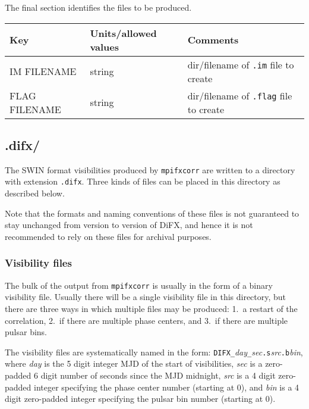 The final section identifies the files to be produced.

\begin{center}
\begin{tabular}{l l l}
\hline
Key & Units/allowed values & Comments \\
\hline
IM FILENAME        & string         & dir/filename of {\tt .im} file to create \\
FLAG FILENAME      & string         & dir/filename of {\tt .flag} file to create \\
\hline
\end{tabular}
\end{center}





\subsection{.difx/} \label{sec:difx}

The SWIN format visibilities produced by {\tt mpifxcorr} are written to a directory with extension {\tt .difx}.
Three kinds of files can be placed in this directory as described below.

Note that the formats and naming conventions of these files is not guaranteed to stay unchanged from version to version of DiFX, and hence it is not recommended to rely on these files for archival purposes.

\subsubsection{Visibility files} \label{sec:difxvisibilities}

The bulk of the output from {\tt mpifxcorr} is usually in the form of a binary visibility file.
Usually there will be a single visibility file in this directory, but there are three ways in which multiple files may be produced: 1.\ a restart of the correlation, 2.\ if there are multiple phase centers, and 3.\ if there are multiple pulsar bins.

The visibility files are systematically named in the form: {\tt DIFX\_}{\em day}{\tt \_}{\em sec}{\tt .s}{\em src}{\tt .b}{\em bin}, where {\em day} is the 5 digit integer MJD of the start of visibilities, {\em sec} is a zero-padded 6 digit number of seconds since the MJD midnight, {\em src} is a 4 digit zero-padded integer specifying the phase center number (starting at 0), and {\em bin} is a 4 digit zero-padded integer specifying the pulsar bin number (starting at 0).

